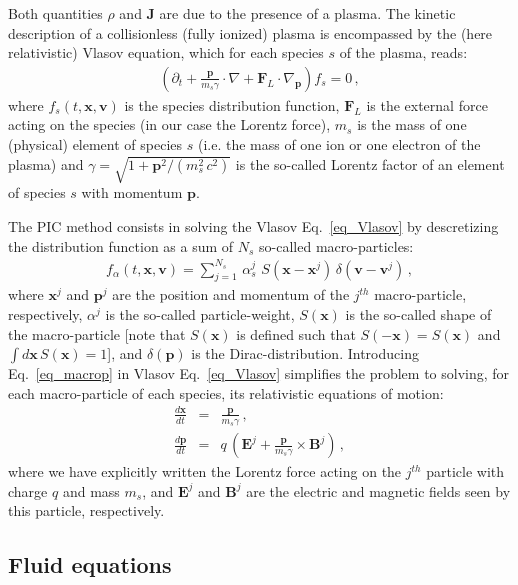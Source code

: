 \documentclass[11pt,a4paper]{article}
\newcommand{\vE}{\mathbf{E}}
\newcommand{\vB}{\mathbf{B}}
\newcommand{\vJ}{\mathbf{J}}
\newcommand{\vx}{\mathbf{x}}
\newcommand{\vp}{\mathbf{p}}
\newcommand{\vv}{\mathbf{v}}
\newcommand{\vF}{\mathbf{F}}
\begin{document}
Both quantities $\rho$ and $\vJ$ are due to the presence of a plasma.
The kinetic description of a collisionless (fully ionized) plasma is encompassed by the (here relativistic) Vlasov equation, which for each species $s$ of the plasma, reads:
\begin{eqnarray}\label{eq_Vlasov}
\left(\partial_t  + \frac{\vp}{m_s \gamma} \cdot \nabla + \vF_L \cdot \nabla_{\vp} \right) f_s = 0\,,
\end{eqnarray}
where $f_s(t,\vx,\vv)$ is the species distribution function, $\vF_L$ is the external force acting on the species (in our case the Lorentz force), $m_s$ is the mass of one (physical) element of species $s$ (i.e. the mass of one ion or one electron of the plasma) and $\gamma = \sqrt{1+\vp^2/(m_s^2\,c^2)}$ is the so-called Lorentz factor of an element of species $s$ with momentum $\vp$.

The PIC method consists in solving the Vlasov Eq.~\eqref{eq_Vlasov} by descretizing the distribution function as a sum of $N_s$ so-called macro-particles:
\begin{eqnarray}\label{eq_macrop}
f_\alpha (t,\vx,\vv) = \sum_{j=1}^{N_s}\,\alpha_s^j\,\,S(\vx-\vx^j)\,\delta(\vv-\vv^j)\,,
\end{eqnarray}
where $\vx^j$ and $\vp^j$ are the position and momentum of the $j^{th}$ macro-particle, respectively, $\alpha^j$ is the so-called particle-weight, $S(\vx)$ is the so-called shape of the macro-particle [note that $S(\vx)$ is defined such that $S(-\vx)=S(\vx)$ and $\int d\vx\,S(\vx)=1$], and $\delta(\vp)$ is the Dirac-distribution. Introducing Eq.~\eqref{eq_macrop} in Vlasov Eq.~\eqref{eq_Vlasov} simplifies the problem to solving, for each macro-particle of each species, its relativistic equations of motion:
\begin{subequations}
\begin{eqnarray}
\frac{d\vx}{dt}  &=& \frac{\vp}{m_s \gamma}\,,\\
\frac{d\vp}{dt}  &=&  q\,\left( \vE^j + \frac{\vp}{m_s \gamma} \times \vB^j \right)\,,
\end{eqnarray}
\end{subequations}
where we have explicitly written the Lorentz force acting on the $j^{th}$ particle with charge $q$ and mass $m_s$, and $\vE^j$ and $\vB^j$ are the electric and magnetic fields seen by this particle, respectively.

\subsection*{Fluid equations}
\end{document}
